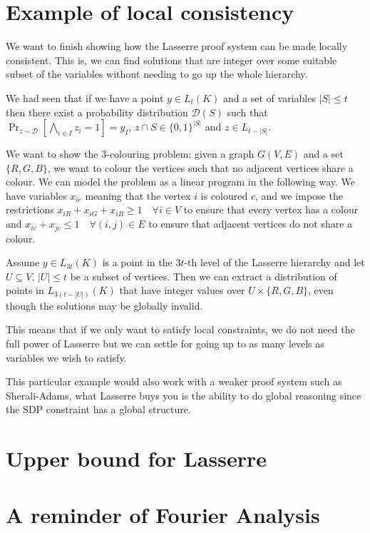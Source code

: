 \documentclass[a4paper,twoside,justified]{tufte-handout}
\begin{document}
 

\section{Example of local consistency}

We want to finish showing how the Lasserre proof system can be made locally consistent. This is, we can find solutions that are integer over some suitable subset of the variables without needing to go up the whole hierarchy.

We had seen that if we have a point $y\in L_t(K)$ and a set of variables $|S| \leq t$ then there exist a probability distribution $\mathcal{D}(S)$ such that $\Pr_{z \sim \mathcal{D}} [ \bigwedge_{i \in I} z_i =1 ] = y_I$, $z \cap S \in \{0,1\}^{|S|}$ and $z \in L_{t - |S|}$.

We want to show the 3-colouring problem: given a graph $G(V,E)$ and a set $\{R,G,B\}$, we want to colour the vertices such that no adjacent vertices share a colour. We can model the problem as a linear program in the following way. We have variables $x_{ic}$ meaning that the vertex $i$ is coloured $c$, and we impose the restrictions $x_{iR}+x_{iG}+x_{iB} \geq 1 \quad \forall i\in V$ to ensure that every vertex has a colour and $x_{ic} + x_{jc} \leq 1 \quad \forall (i,j) \in E$ to ensure that adjacent vertices do not share a colour.

Assume $y \in L_{3t}(K)$ is a point in the $3t$-th level of the Lasserre hierarchy and let $U \subseteq V$, $|U| \leq t$ be a subset of vertices. Then we can extract a distribution of points in $L_{3(t-|U|)}(K)$ that have integer values over $U \times \{R,G,B\}$, even though the solutions may be globally invalid.

This means that if we only want to satisfy local constraints, we do not need the full power of Lasserre but we can settle for going up to as many levels as variables we wish to satisfy.

This particular example would also work with a weaker proof system such as Sherali-Adams, what Lasserre buys you is the ability to do global reasoning since the SDP constraint has a global structure.

\section{Upper bound for Lasserre}

\section{A reminder of Fourier Analysis}
\end{document}
